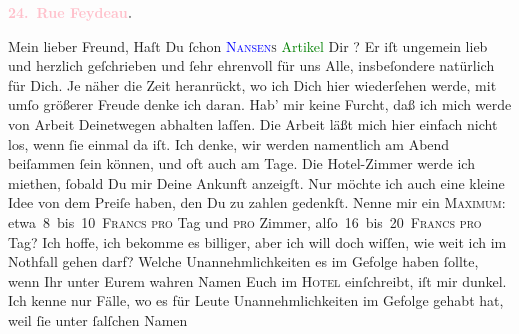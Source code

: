            \pstart
           \begin{otherlanguage}{french}\textcolor{gray}{\textbf{\textbf{\textcolor{pink}{24. Rue Feydeau}{}\ledrightnote{\textcolor{pink}{rue Feydeau}}.}}}\end{otherlanguage}\pend
           \pstart\center{}Mein lieber Freund,\pend\pstart
           Haſt Du ſchon \textsc{\textcolor{blue}{Nansen}{}\ledrightnote{\textcolor{blue}{Peter Nansen}}s}{ }\textcolor{green}{Artikel}{} Dir \label{K_L02806-1v}\label{K_L02806-1h}? Er iſt ungemein lieb und herzlich geſchrieben und ſehr ehrenvoll für uns
               Alle, insbeſondere natürlich für Dich.\pend
           \pstart
           Je näher die Zeit heranrückt, wo ich Dich hier wiederſehen werde, mit umſo größerer
               Freude denke ich daran. Hab’ mir keine Furcht, daß ich mich werde von Arbeit
               Deinetwegen abhalten laſſen. Die Arbeit läßt mich hier einfach nicht los, wenn ſie
               einmal da iſt. Ich denke, wir werden namentlich am Abend beiſammen ſein können, und oft auch am Tage. {\pb} Die Hotel-Zimmer werde ich miethen, ſobald Du mir
               Deine Ankunft anzeigſt. Nur möchte ich auch eine kleine Idee von dem Preiſe haben,
               den Du zu zahlen gedenkſt. \strikeout{\textcolor{gray}{Nenne}} Nenne mir ein \textsc{Maximum}: etwa 8 bis 10 \textsc{Francs}{ }\textsc{pro} Tag und \textsc{pro} Zimmer,
                  alſo 16 bis 20 \textsc{Francs}{ }\textsc{pro} Tag? Ich hoffe, ich bekomme es billiger, aber ich will
               doch wiſſen, wie weit ich im Nothfall gehen darf?\pend
           \pstart
           Welche Unannehmlichkeiten es im Gefolge haben ſollte, wenn Ihr unter Eurem wahren
               Namen Euch im \textsc{Hotel} einſchreibt, iſt mir dunkel. Ich kenne
               nur Fälle, wo es für Leute {\pb} Unannehmlichkeiten im Gefolge gehabt hat, weil ſie unter ſalſchen Namen
